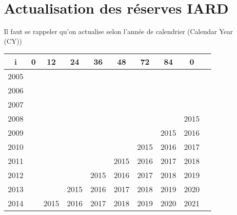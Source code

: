 \section{Actualisation des réserves IARD}
Il faut se rappeler qu'on actualise selon l'année de calendrier (Calendar Year (CY))

\begin{center}
\begin{tabular}{|c|c|c|c|c|c|c|c|c|c|}
  \hline
   i & 0 & 12 & 24 & 36 & 48 & 72 & 84 & 0  \\
  \hline
  2005 & & & & & & & & \\
  2006 & & & & & & & & \\
  2007 & & & & & & & & \\
  2008 & & & & & & & & 2015 \\
  2009 & & & & & & & 2015 & 2016 \\
  2010 & & & & & & 2015 & 2016 & 2017 \\
  2011 & & & & & 2015 & 2016 & 2017 & 2018 \\
  2012 & & & & 2015 & 2016 & 2017 & 2018 & 2019  \\
  2013 & & & 2015 & 2016 & 2017 & 2018 & 2019 & 2020  \\
  2014 & & 2015 & 2016 & 2017 & 2018 & 2019 & 2020 & 2021  \\
  \hline
\end{tabular}
\end{center}

